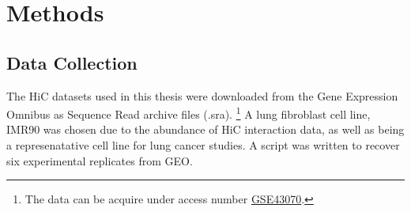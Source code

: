 \documentclass[phd,tocprelim]{cornell}
\begin{document}

\chapter{Methods}

\section{Data Collection}

The HiC datasets used in this thesis were downloaded from the Gene
Expression Omnibus as Sequence Read archive files (.sra).
  \footnote{
    The data can be acquire under access number
    \href{http://www.ncbi.nlm.nih.gov/geo/query/acc.cgi?acc=GSE43070}
    {GSE43070}.\cite{Ren2013}
  }
A lung fibroblast cell line, IMR90 was chosen due to the abundance of
HiC interaction data, as well as being a represenatative cell line
for lung cancer studies.  A script was written to recover six experimental
replicates from GEO.
\end{document}
